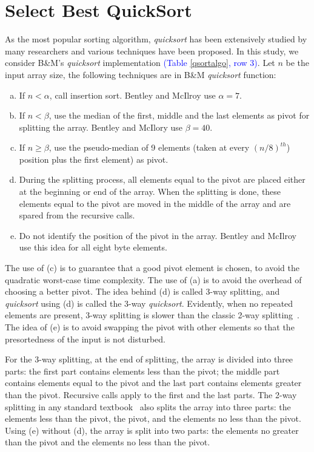 \documentclass[AMA,STIX1COL]{WileyNJD-v2}
\newcommand{\qusort}{\emph{quicksort }}
\newcommand{\qusortn}{\emph{quicksort}}
\begin{document}
\section{Select Best QuickSort}       
As the most popular sorting algorithm, \qusort has been extensively studied by many researchers and various techniques have been proposed. 
In this study, we consider B\&M’s \qusort implementation \textcolor{blue}{(Table \ref{qsortalgo}, row 3)}. 
Let $n$ be the input array size, the following techniques are in B\&M \qusort function: 

\begin{enumerate}[(a)]
\item If $n < \alpha$, call insertion sort. Bentley and McIlroy use $\alpha = 7$.
\item If $n < \beta$, use the median of the first, middle and the last elements as pivot for splitting the array. Bentley and McIlory use $\beta = 40$.
\item If $n \geq \beta$, use the pseudo-median of 9 elements (taken at every $(n/8)^{th}$) position plus the first element) as pivot.
\item During the splitting process, all elements equal to the pivot are placed either at the beginning or end of the array. When the splitting is done, these elements equal to the pivot are moved in the middle of the array and are spared from the recursive calls.
\item Do not identify the position of the pivot in the array. Bentley and McIlroy use this idea for all eight byte elements.
\end{enumerate}

The use of (c) is to guarantee that a good pivot element is chosen, to avoid the quadratic worst-case time complexity.  
The use of (a) is to avoid the overhead of choosing a better pivot. The idea behind (d) is called 3-way splitting, and \qusort using (d) is called the 3-way \qusortn. 
Evidently, when no repeated elements are present, 3-way splitting is slower than the classic 2-way splitting~\cite{10.5555/1614191}. 
The idea of (e) is to avoid swapping the pivot with other elements so that the presortedness of the input is not disturbed. 

For the 3-way splitting, at the end of splitting, the array is divided into three parts: the first part contains elements less than the pivot; the middle part contains elements equal to the pivot and the last part contains elements greater than the pivot. 
Recursive calls apply to the first and the last parts. 
The 2-way splitting in any standard textbook~\cite{10.5555/1614191} also splits the array into three parts: the elements less than the pivot, the pivot, and the elements no less than the pivot. 
Using (e) without (d), the array is split into two parts: the elements no greater than the pivot and the elements no less than the pivot. 
\end{document}
